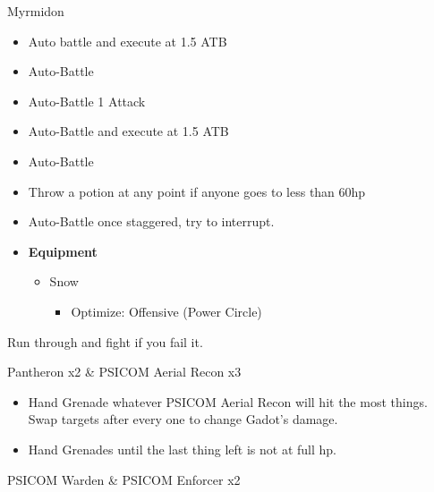 
	\begin{battle}[0:45]{Myrmidon}
		\begin{itemize}
			\item Auto battle and execute at 1.5 ATB
			\item Auto-Battle
			\item Auto-Battle 1 Attack
			\item Auto-Battle and execute at 1.5 ATB
			\item Auto-Battle
			\item Throw a potion at any point if anyone goes to less than 60hp
			\item Auto-Battle once staggered, try to interrupt.
		\end{itemize}

	\end{battle}


	\begin{menu}
		\begin{itemize}
			\item \textbf{Equipment}
			      \begin{itemize}
				      \item Snow
				            \begin{itemize}
					            \item Optimize: Offensive (Power Circle)
				            \end{itemize}
			      \end{itemize}
		\end{itemize}
	\end{menu}

	Run through and fight if you fail it.

	\begin{battle}[0:30]{Pantheron x2 \& PSICOM Aerial Recon x3}
		\begin{itemize}
			\item Hand Grenade whatever PSICOM Aerial Recon will hit the most things. Swap targets after every one to change Gadot's damage.
			\item Hand Grenades until the last thing left is not at full hp.
		\end{itemize}

	\end{battle}

	\begin{battle}[0:15]{PSICOM Warden \& PSICOM Enforcer x2}
	\end{battle}

